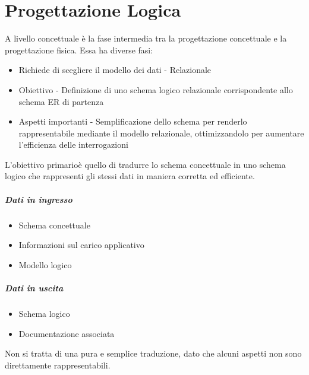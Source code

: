 \chapter{Progettazione Logica}
A livello concettuale è la fase intermedia tra la progettazione concettuale e la progettazione fisica.
Essa ha diverse fasi:
\begin{itemize}
    \item Richiede di scegliere il modello dei dati - Relazionale
    \item Obiettivo - Definizione di uno schema logico relazionale corrispondente allo
    schema ER di partenza
    \item Aspetti importanti - Semplificazione dello schema per renderlo rappresentabile
    mediante il modello relazionale, ottimizzandolo per aumentare l'efficienza delle
    interrogazioni
\end{itemize}
L'obiettivo primarioè quello di tradurre lo schema concettuale in uno schema logico
che rappresenti gli stessi dati in maniera corretta ed efficiente.\\
\paragraph*{Dati in ingresso}
\begin{itemize}
    \item Schema concettuale
    \item Informazioni sul carico applicativo
    \item Modello logico
\end{itemize}
\paragraph*{Dati in uscita}
\begin{itemize}
    \item Schema logico
    \item Documentazione associata
\end{itemize}
Non si tratta di una pura e semplice traduzione, dato che alcuni aspetti non
sono direttamente rappresentabili.
